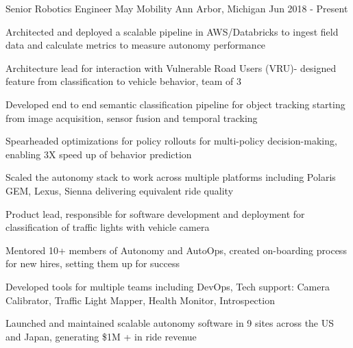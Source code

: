 
\begin{cventries}

  \cventry
    {Senior Robotics Engineer} %
    {May Mobility} %
    {Ann Arbor, Michigan} %
    {Jun 2018 - Present} %
    {
      \begin{cvitems} %
        \item {Architected and deployed a scalable pipeline in AWS/Databricks to ingest field data and calculate metrics to measure autonomy performance}
        \item {Architecture lead for interaction with Vulnerable Road Users (VRU)- designed feature from classification to vehicle behavior, team of 3}
        \item {Developed end to end semantic classification pipeline for object tracking starting from image acquisition, sensor fusion and temporal tracking}
		\item {Spearheaded optimizations for policy rollouts for multi-policy decision-making, enabling 3X speed up of behavior prediction }
		\item {Scaled the autonomy stack to work across multiple platforms including Polaris GEM, Lexus, Sienna delivering equivalent ride quality}
        \item {Product lead, responsible for software development and deployment for classification of traffic lights with vehicle camera}
        \item {Mentored 10+ members of Autonomy and AutoOps, created on-boarding process for new hires, setting them up for success}
        \item {Developed tools for multiple teams including DevOps, Tech support: Camera Calibrator, Traffic Light Mapper, Health Monitor, Introspection}
        \item {Launched and maintained scalable autonomy software in 9 sites across the US and Japan, generating \$1M + in ride revenue }
      \end{cvitems}
    }


\end{cventries}
